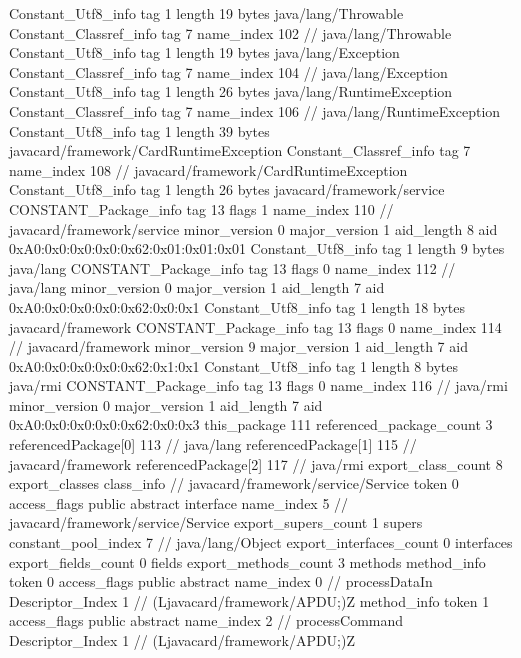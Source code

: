 {{{		}
		Constant_Utf8_info {
			tag	1
			length	19
			bytes	java/lang/Throwable
		}
		Constant_Classref_info {
			tag	7
			name_index	102		// java/lang/Throwable
		}
		Constant_Utf8_info {
			tag	1
			length	19
			bytes	java/lang/Exception
		}
		Constant_Classref_info {
			tag	7
			name_index	104		// java/lang/Exception
		}
		Constant_Utf8_info {
			tag	1
			length	26
			bytes	java/lang/RuntimeException
		}
		Constant_Classref_info {
			tag	7
			name_index	106		// java/lang/RuntimeException
		}
		Constant_Utf8_info {
			tag	1
			length	39
			bytes	javacard/framework/CardRuntimeException
		}
		Constant_Classref_info {
			tag	7
			name_index	108		// javacard/framework/CardRuntimeException
		}
		Constant_Utf8_info {
			tag	1
			length	26
			bytes	javacard/framework/service
		}
		CONSTANT_Package_info {
			tag	13
			flags	1
			name_index	110		// javacard/framework/service
			minor_version	0
			major_version	1
			aid_length	8
			aid	0xA0:0x0:0x0:0x0:0x62:0x01:0x01:0x01
		}
		Constant_Utf8_info {
			tag	1
			length	9
			bytes	java/lang
		}
		CONSTANT_Package_info {
			tag	13
			flags	0
			name_index	112		// java/lang
			minor_version	0
			major_version	1
			aid_length	7
			aid	0xA0:0x0:0x0:0x0:0x62:0x0:0x1
		}
		Constant_Utf8_info {
			tag	1
			length	18
			bytes	javacard/framework
		}
		CONSTANT_Package_info {
			tag	13
			flags	0
			name_index	114		// javacard/framework
			minor_version	9
			major_version	1
			aid_length	7
			aid	0xA0:0x0:0x0:0x0:0x62:0x1:0x1
		}
		Constant_Utf8_info {
			tag	1
			length	8
			bytes	java/rmi
		}
		CONSTANT_Package_info {
			tag	13
			flags	0
			name_index	116		// java/rmi
			minor_version	0
			major_version	1
			aid_length	7
			aid	0xA0:0x0:0x0:0x0:0x62:0x0:0x3
		}
	}
	this_package	111
	referenced_package_count	3
	referencedPackage[0]	113		// java/lang
	referencedPackage[1]	115		// javacard/framework
	referencedPackage[2]	117		// java/rmi
	export_class_count	8
	export_classes {
		class_info {		// javacard/framework/service/Service
			token	0
			access_flags	public abstract interface
			name_index	5		// javacard/framework/service/Service
			export_supers_count	1
			supers {
				constant_pool_index	7		// java/lang/Object
			}
			export_interfaces_count	0
			interfaces {
			}
			export_fields_count	0
			fields {
			}
			export_methods_count	3
			methods {
				method_info {
					token	0
					access_flags	public abstract
					name_index	0		// processDataIn
					Descriptor_Index	1		// (Ljavacard/framework/APDU;)Z
				}
				method_info {
					token	1
					access_flags	public abstract
					name_index	2		// processCommand
					Descriptor_Index	1		// (Ljavacard/framework/APDU;)Z
}}}}}
